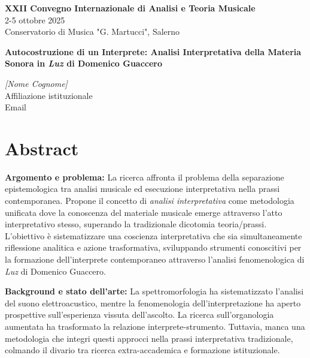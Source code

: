 \documentclass[12pt,a4paper]{article}
\newcommand{\convegnotitolo}{XXII Convegno Internazionale di Analisi e Teoria Musicale}
\newcommand{\convegnodate}{2-5 ottobre 2025}
\newcommand{\convegnosede}{Conservatorio di Musica "G. Martucci", Salerno}
\begin{document}
\begin{center}
{\small \textbf{\convegnotitolo} \\
\convegnodate \\
\convegnosede}
\end{center}

\vspace{1cm}

\begin{center}
{\Large \textbf{Autocostruzione di un Interprete: Analisi Interpretativa della Materia Sonora in \textit{Luz} di Domenico Guaccero}}
\end{center}

\vspace{0.5cm}

\begin{center}
{\textit{[Nome Cognome]} \\
Affiliazione istituzionale \\
Email}
\end{center}

\vspace{1cm}

\section*{Abstract}

\textbf{Argomento e problema:} La ricerca affronta il problema della separazione epistemologica tra analisi musicale ed esecuzione interpretativa nella prassi contemporanea. Propone il concetto di \textit{analisi interpretativa} come metodologia unificata dove la conoscenza del materiale musicale emerge attraverso l'atto interpretativo stesso, superando la tradizionale dicotomia teoria/prassi. L'obiettivo è sistematizzare una coscienza interpretativa che sia simultaneamente riflessione analitica e azione trasformativa, sviluppando strumenti conoscitivi per la formazione dell'interprete contemporaneo attraverso l'analisi fenomenologica di \textit{Luz} di Domenico Guaccero.

\textbf{Background e stato dell'arte:} La spettromorfologia \cite{smalley1997spectromorphology} ha sistematizzato l'analisi del suono elettroacustico, mentre la fenomenologia dell'interpretazione \cite{rognoni1966fenomenologia, ihde2007listening} ha aperto prospettive sull'esperienza vissuta dell'ascolto. La ricerca sull'organologia aumentata \cite{lupone2003feedback} ha trasformato la relazione interprete-strumento. Tuttavia, manca una metodologia che integri questi approcci nella prassi interpretativa tradizionale, colmando il divario tra ricerca extra-accademica e formazione istituzionale.
\end{document}
